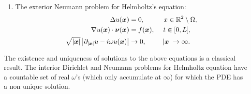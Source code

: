 \begin{enumerate}
\item The exterior Neumann problem for Helmholtz's equation:
\begin{align}\label{eqn:BVPEDH}
\Delta u(\boldsymbol{x}) &= 0, \hspace{1 cm} x \in \mathbb{R}^2\setminus\Omega,\\
\nabla u(\boldsymbol{x})\cdot \boldsymbol{\nu}(\boldsymbol{x})  &= f(\boldsymbol{x}), \hspace{0.43 cm} t \in[0,L], \\
\sqrt{|\boldsymbol{x}|} \left|\partial_{|\boldsymbol{x}|} u - i\omega u(\boldsymbol{x})\right| &\to 0 , \hspace{0.86cm} |\boldsymbol{x}| \to \infty.
\end{align}

\end{enumerate}

\begin{remark}
The existence and uniqueness of solutions to the above equations is a classical result. 
The interior Dirichlet and Neumann problems for Helmholtz equation have a countable set of
real $\omega$'s (which only accumulate at $\infty$)  for which the PDE has a non-unique solution. 
\end{remark}
